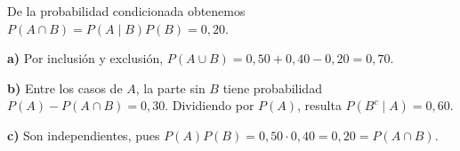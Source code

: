 De la probabilidad condicionada obtenemos $P(A\cap B)=P(A\mid B)P(B)=0{,}20$.

\textbf{a)} Por inclusión y exclusión, $P(A\cup B)=0{,}50+0{,}40-0{,}20=\boxed{0{,}70}$.

\textbf{b)} Entre los casos de $A$, la parte sin $B$ tiene probabilidad $P(A)-P(A\cap B)=0{,}30$. Dividiendo por $P(A)$, resulta $P(B^c\mid A)=\boxed{0{,}60}$.

\textbf{c)} Son independientes, pues $P(A)P(B)=0{,}50\cdot0{,}40=0{,}20=P(A\cap B)$.
